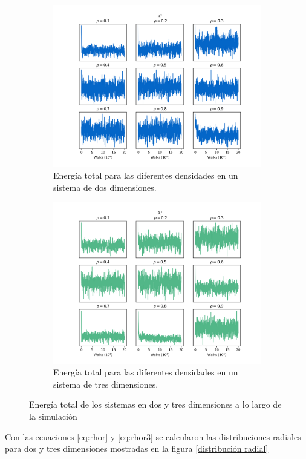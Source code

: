 \documentclass[reprint,amsmath,amssymb,aps,]{revtex4-2}
\begin{document}
\begin{figure}[H]
    \centering
    \begin{subfigure}[b]{\linewidth}
    \includegraphics[scale=0.34]{../Graphics/Energy_2.png}
    \caption{Energía total para las diferentes densidades en un sistema de dos dimensiones.}
    \end{subfigure}
    \begin{subfigure}[b]{\linewidth}
        \includegraphics[scale=0.34]{../Graphics/Energy_3.png}
        \caption{Energía total para las diferentes densidades en un sistema de tres dimensiones.}
    \end{subfigure}
    \caption{Energía total de los sistemas en dos y tres dimensiones a lo largo de la simulación}
    \label{energias}
\end{figure}
Con las ecuaciones \ref{eq:rhor} y \ref{eq:rhor3} se calcularon las distribuciones radiales para dos y tres dimensiones mostradas en la figura \ref{distribución radial}
\end{document}

